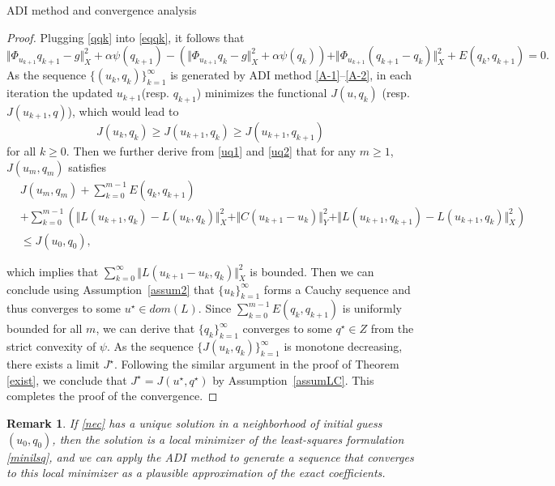 \documentclass[11pt]{article}%
\renewcommand{\_}{{\fontfamily{ptm}\selectfont\textunderscore}}
\theoremstyle{plain}
\numberwithin{equation}{section}
\newtheorem{remark}{Remark}
\def\rt{\right} \def\lt{\left}
\begin{document}
\begin{section}{ADI method and convergence analysis}
\begin{proof}
Plugging \eqref{qqk} into \eqref{eqqk}, it follows that  
\begin{equation}
\Vert \Phi_{u_{k+1}} q_{k+1}-g\Vert_X^2+\alpha\psi(q_{k+1})-\lt(\Vert \Phi_{u_{k+1}} q_{k}-g\Vert_X^2+\alpha\psi\lt( q_{k}\rt)\rt)+\Vert \Phi_{u_{k+1}}( q_{k+1}- q_{k})\Vert_X^2
+E( q_{k}, q_{k+1})=0.\label{uq2}
\end{equation}
As the sequence $\{(u_k,q_k)\}_{k=1}^\infty$ is generated by ADI method \eqref{A-1}--\eqref{A-2}, in each iteration the updated $u_{k+1}$(resp. $q_{k+1}$) minimizes the functional $J(u, q_{k})$ (resp. $J(u_{k+1}, q)$), which would lead to
\begin{equation*}
J(u_k,  q_k) \ge J(u_{k+1}, q_k)\ge  J(u_{k+1}, q_{k+1})
\end{equation*}
for all $k\geq 0$.
Then we further derive from \eqref{uq1} and \eqref{uq2} that for any $m\geq 1$, $J(u_m, q_m)$ satisfies
\begin{align}
&J(u_m, q_m) + \sum_{k=0}^{m-1} E( q_k, q_{k+1}) \nonumber \\
&+\sum_{k=0}^{m-1}\left(\Vert L\lt(u_{k+1}, q_k\rt)-L\lt(u_k, q_k\rt)\Vert_X^2+\Vert C\lt(u_{k+1}-u_k\rt)\Vert_Y^2 +\Vert L\lt(u_{k+1}, q_{k+1}\rt)-L\lt(u_{k+1}, q_k\rt)\Vert_X^2\right) \nonumber \\
&\leq J(u_0, q_0),\label{est}
\end{align}

 which implies that  $\sum_{k=0}^{\infty}\Vert L\lt(u_{k+1}-u_k, q_k\rt)\Vert_X^2$ is bounded.  Then we can conclude using Assumption~\ref{assum2}
that $\{u_k\}_{k=1}^\infty$ forms a Cauchy sequence and thus converges to some $u^\star\in {dom(L)}$. Since $\sum_{k=0}^{m-1} E(q_k, q_{k+1})$ is uniformly bounded for all $m$, we can derive that $\{q_k\}_{k=1}^\infty$ converges to some $q^\star\in Z$ from the strict convexity of $\psi$. As the sequence $\{J(u_k,q_k)\}_{k=1}^\infty$ is monotone decreasing, there exists a limit $J^\star$.  Following the similar argument in the proof of Theorem \ref{exist}, we conclude that  $J^\star = J(u^\star, q^\star)$ by Assumption~\ref{assumLC}.
This completes the proof of the convergence. 
\end{proof}

\begin{remark}
 If \eqref{nec} has a unique solution in a neighborhood of initial guess $(u_0, q_0)$, then the solution is a local minimizer of the least-squares formulation \eqref{minilsq}, and we can apply the ADI method to generate a sequence that converges to this local minimizer 
as a plausible approximation of the exact coefficients.
\end{remark}

\end{section}
\end{document}
